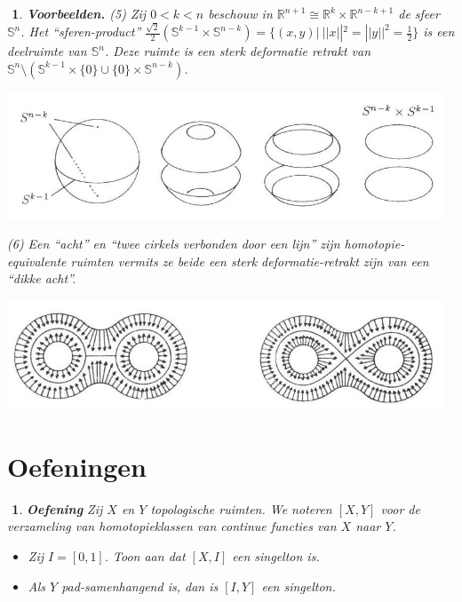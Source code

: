 \documentclass[12pt]{book}
\newcommand{\R}{\mathbb{R}}
\newtheorem{vbnh}[stelh]{$\!\!$}
\newenvironment{vbn}{\begin{vbnh} \em {\bf Voorbeelden.}}{\end{vbnh}}
\newtheorem{eoef}{$\!\!$}[chapter]
\newenvironment{oef}{\begin{eoef} {\bf Oefening}}{\end{eoef}}
\begin{document}
\begin{vbn}
(5) 
Zij $0<k<n$ beschouw in $\R^{n+1}\cong \R^{k}\times \R^{n-k+1}$ de sfeer $\mathbb{S}^{n}$.
Het ``sferen-product'' $\frac{\sqrt{2}}{2}(\mathbb{S}^{k-1}\times \mathbb{S}^{n-k}) =\{(x,y)| \ || x ||^{2}=||y ||^{2}=\frac{1}{2}\}$ is een deelruimte van $\mathbb{S}^{n}$.
Deze ruimte is een sterk deformatie retrakt van $\mathbb{S}^{n}\setminus (\mathbb{S}^{k-1}\times \{0\}\cup \{0\}\times \mathbb{S}^{n-k})$.

\begin{center}
\includegraphics[width=13cm]{images/halfsferen.jpg}
\end{center}


(6)
Een ``acht'' en ``twee cirkels verbonden door een lijn'' zijn homotopie-equivalente ruimten vermits ze beide een sterk deformatie-retrakt zijn van een ``dikke acht''.

\begin{center}
\includegraphics[width=13cm]{images/acht.jpg}
\end{center} 


%
\end{vbn}
%
\section*{Oefeningen}


\begin{oef} Zij $X$ en $Y$ topologische ruimten. We noteren $[X,Y]$ voor de verzameling van homotopieklassen van continue functies van $X$ naar $Y$.

\begin{itemize}
\item[(a)] Zij $I=[0,1]$. Toon aan dat $[X,I]$ een singelton is.
\item[(b)] Als $Y$ pad-samenhangend is, dan is $[I,Y]$ een singelton.
\end{itemize}
\end{oef}
\end{document}
